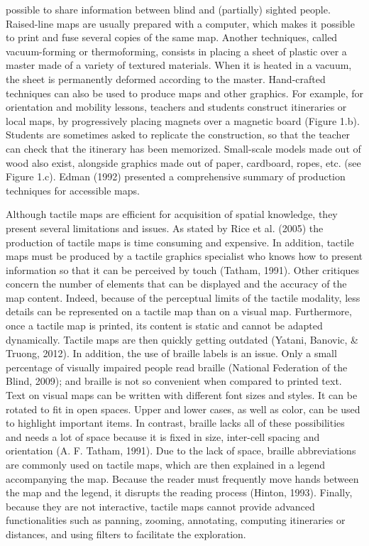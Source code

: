 {possible to  share  information  between  blind  and  (partially)  sighted  people.  Raised-line  maps  are  usually prepared with a computer, which makes it possible to print and fuse several copies of the same map.  Another techniques, called vacuum-forming or thermoforming, consists in placing a sheet of plastic over a  master made of a variety of textured materials.  When it is heated in a vacuum, the sheet is permanently  deformed  according  to  the  master.  Hand-crafted  techniques  can  also  be  used  to produce maps and  other  graphics.  For example,  for orientation and mobility lessons,  teachers  and students construct itineraries or local maps, by progressively placing magnets over a magnetic board (Figure  1.b).  Students are  sometimes asked  to replicate  the  construction, so  that the  teacher can check  that  the  itinerary  has  been  memorized.  Small-scale  models  made  out  of  wood  also  exist, alongside  graphics  made  out  of  paper,  cardboard,  ropes,  etc.  (see  Figure  1.c).  Edman  (1992) presented a comprehensive summary of production techniques for accessible maps. 
   
   
   Although  tactile  maps  are  efficient  for  acquisition  of  spatial  knowledge,  they  present  several limitations  and  issues.  As  stated  by  Rice  et  al.  (2005)  the  production  of  tactile  maps  is  time consuming and expensive. In addition, tactile maps must be produced by a tactile graphics specialist who knows how to present information so that it can be perceived by touch (Tatham, 1991). Other critiques  concern  the  number  of  elements  that  can  be  displayed  and  the  accuracy  of  the  map content.  Indeed,  because  of  the  perceptual  limits  of  the  tactile  modality,  less  details  can  be represented on a tactile map  than  on  a visual map. Furthermore, once  a tactile  map is printed,  its content is static and cannot be adapted dynamically. Tactile maps are then quickly getting outdated (Yatani,  Banovic, &  Truong,  2012).  In  addition,  the  use  of  braille  labels  is  an  issue.  Only  a  small percentage  of  visually  impaired  people  read  braille  (National  Federation of  the Blind,  2009);  and braille is not so convenient when compared to printed text. Text on visual maps can be written with different font sizes and styles. It can be rotated to fit in open spaces. Upper and lower cases, as well as color, can be used to highlight important  items.  In  contrast,  braille  lacks all of these possibilities and needs a lot of  space  because it is  fixed  in  size, inter-cell spacing and orientation (A. F. Tatham, 1991). Due to the lack of space, braille abbreviations are commonly used on tactile maps, which are then explained in a legend accompanying the map. Because the reader must frequently move hands between  the  map and  the  legend, it  disrupts the  reading process  (Hinton,  1993). Finally,  because they  are  not  interactive,  tactile  maps  cannot  provide  advanced  functionalities  such  as  panning, zooming, annotating, computing itineraries or distances, and using filters to facilitate the exploration.
}

